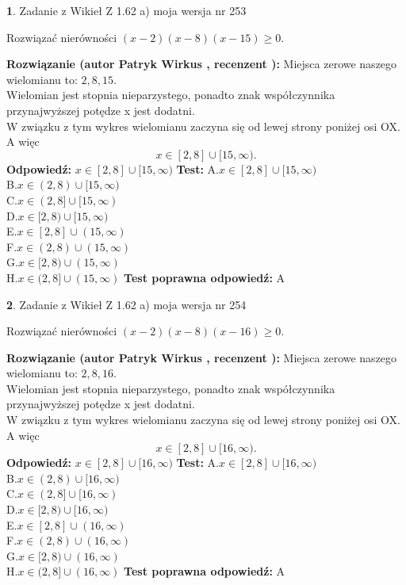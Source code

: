 \documentclass[12pt, a4paper]{article}
\theoremstyle{definition} %
\newtheorem{zad}{}
\newcommand{\zadStart}[1]{\begin{zad}#1\newline}
\newcommand{\zadStop}{\end{zad}}
\newcommand{\rozwStart}[2]{\noindent \textbf{Rozwiązanie (autor #1 , recenzent #2): }\newline}
\newcommand{\rozwStop}{\newline}
\newcommand{\odpStart}{\noindent \textbf{Odpowiedź:}\newline}
\newcommand{\odpStop}{\newline}
\newcommand{\testStart}{\noindent \textbf{Test:}\newline}
\newcommand{\testStop}{\newline}
\newcommand{\kluczStart}{\noindent \textbf{Test poprawna odpowiedź:}\newline}
\newcommand{\kluczStop}{\newline}
\begin{document}
\zadStart{Zadanie z Wikieł Z 1.62 a) moja wersja nr 253}

Rozwiązać nierówności $(x-2)(x-8)(x-15)\ge0$.
\zadStop
\rozwStart{Patryk Wirkus}{}
Miejsca zerowe naszego wielomianu to: $2, 8, 15$.\\
Wielomian jest stopnia nieparzystego, ponadto znak współczynnika przy\linebreak najwyższej potędze x jest dodatni.\\ W związku z tym wykres wielomianu zaczyna się od lewej strony poniżej osi OX. A więc $$x \in [2,8] \cup [15,\infty).$$
\rozwStop
\odpStart
$x \in [2,8] \cup [15,\infty)$
\odpStop
\testStart
A.$x \in [2,8] \cup [15,\infty)$\\
B.$x \in (2,8) \cup [15,\infty)$\\
C.$x \in (2,8] \cup [15,\infty)$\\
D.$x \in [2,8) \cup [15,\infty)$\\
E.$x \in [2,8] \cup (15,\infty)$\\
F.$x \in (2,8) \cup (15,\infty)$\\
G.$x \in [2,8) \cup (15,\infty)$\\
H.$x \in (2,8] \cup (15,\infty)$
\testStop
\kluczStart
A
\kluczStop



\zadStart{Zadanie z Wikieł Z 1.62 a) moja wersja nr 254}

Rozwiązać nierówności $(x-2)(x-8)(x-16)\ge0$.
\zadStop
\rozwStart{Patryk Wirkus}{}
Miejsca zerowe naszego wielomianu to: $2, 8, 16$.\\
Wielomian jest stopnia nieparzystego, ponadto znak współczynnika przy\linebreak najwyższej potędze x jest dodatni.\\ W związku z tym wykres wielomianu zaczyna się od lewej strony poniżej osi OX. A więc $$x \in [2,8] \cup [16,\infty).$$
\rozwStop
\odpStart
$x \in [2,8] \cup [16,\infty)$
\odpStop
\testStart
A.$x \in [2,8] \cup [16,\infty)$\\
B.$x \in (2,8) \cup [16,\infty)$\\
C.$x \in (2,8] \cup [16,\infty)$\\
D.$x \in [2,8) \cup [16,\infty)$\\
E.$x \in [2,8] \cup (16,\infty)$\\
F.$x \in (2,8) \cup (16,\infty)$\\
G.$x \in [2,8) \cup (16,\infty)$\\
H.$x \in (2,8] \cup (16,\infty)$
\testStop
\kluczStart
A
\kluczStop
\end{document}
